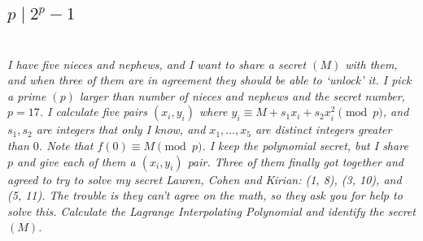 \documentclass[12pt]{article}
\begin{document}
    \subsection{$p \mid 2^p - 1$}

\newpage

\section{} \textit{I have five nieces and nephews, and I want to share a secret $(M)$ with them, and when three of them are in agreement they should be able to `unlock' it. I pick a prime $(p)$ larger than number of nieces and nephews and the secret number, $p = 17$. I calculate five pairs $(x_i, y_i)$ where $y_i \equiv M + s_1 x_i + s_2 x_i ^ 2\pmod{p}$, and $s_1, s_2$ are integers that only I know, and $x_1, \dots, x_5$ are distinct integers greater than $0$. Note that $f(0) \equiv M \pmod{p}$. I keep the polynomial secret, but I share $p$ and give each of them a $(x_i, y_i)$ pair. Three of them finally got together and agreed to try to solve my secret Lauren, Cohen and Kirian: (1, 8), (3, 10), and (5, 11). The trouble is they can't agree on the math, so they ask you for help to solve this. Calculate the Lagrange Interpolating Polynomial and identify the secret $(M)$.}
\end{document}
